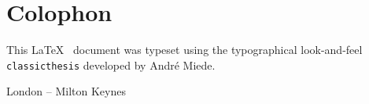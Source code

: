 \pagestyle{empty}

\hfill

\vfill


\section*{Colophon}
This \LaTeX~ document was typeset using the typographical look-and-feel \texttt{classicthesis} developed by Andr\'e Miede. 

\begin{center}
London -- Milton Keynes
\end{center}
 
\bigskip

\noindent\finalVersionString


